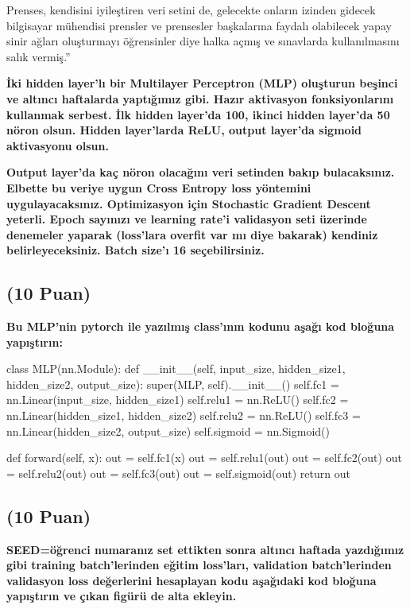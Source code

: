 \documentclass[11pt]{article}
\begin{document}
Prenses, kendisini iyileştiren veri setini de, gelecekte onların izinden gidecek bilgisayar mühendisi prensler ve prensesler başkalarına faydalı olabilecek yapay sinir ağları oluşturmayı öğrensinler diye halka açmış ve sınavlarda kullanılmasını salık vermiş.''

\textbf{İki hidden layer'lı bir Multilayer Perceptron (MLP) oluşturun beşinci ve altıncı haftalarda yaptığımız gibi. Hazır aktivasyon fonksiyonlarını kullanmak serbest. İlk hidden layer'da 100, ikinci hidden layer'da 50 nöron olsun. Hidden layer'larda ReLU, output layer'da sigmoid aktivasyonu olsun.}

\textbf{Output layer'da kaç nöron olacağını veri setinden bakıp bulacaksınız. Elbette bu veriye uygun Cross Entropy loss yöntemini uygulayacaksınız. Optimizasyon için Stochastic Gradient Descent yeterli. Epoch sayınızı ve learning rate'i validasyon seti üzerinde denemeler yaparak (loss'lara overfit var mı diye bakarak) kendiniz belirleyeceksiniz. Batch size'ı 16 seçebilirsiniz.}

\subsection{(10 Puan)} \textbf{Bu MLP'nin pytorch ile yazılmış class'ının kodunu aşağı kod bloğuna yapıştırın:}

\begin{python}
class MLP(nn.Module):
    def __init__(self, input_size, hidden_size1, hidden_size2, output_size):
        super(MLP, self).__init__()
        self.fc1 = nn.Linear(input_size, hidden_size1)
        self.relu1 = nn.ReLU()
        self.fc2 = nn.Linear(hidden_size1, hidden_size2)
        self.relu2 = nn.ReLU()
        self.fc3 = nn.Linear(hidden_size2, output_size)
        self.sigmoid = nn.Sigmoid()
        
    def forward(self, x):
        out = self.fc1(x)
        out = self.relu1(out)
        out = self.fc2(out)
        out = self.relu2(out)
        out = self.fc3(out)
        out = self.sigmoid(out)
        return out
\end{python}

\subsection{(10 Puan)} \textbf{SEED=öğrenci numaranız set ettikten sonra altıncı haftada yazdığımız gibi training batch'lerinden eğitim loss'ları, validation batch'lerinden validasyon loss değerlerini hesaplayan kodu aşağıdaki kod bloğuna yapıştırın ve çıkan figürü de alta ekleyin.}
\end{document}
